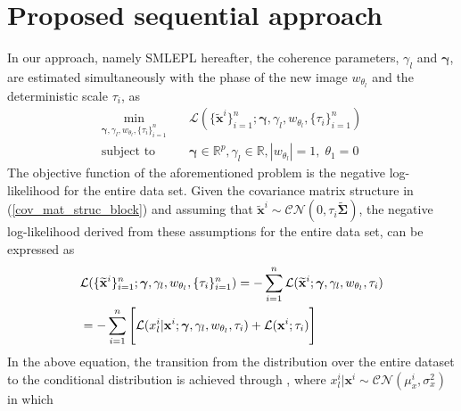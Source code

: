 \section{Proposed sequential approach}
    \label{section:approach}
    
    \vspace{-0.2cm}
    In our approach, namely \acs{SMLEPL} hereafter, the coherence parameters, $\gamma_l$ and $\boldsymbol{\gamma}$, are estimated simultaneously with the phase of the new image $w_{\theta_{l}}$ and the deterministic scale $\tau_i$, as %
    \vspace{-0.5em}
    \begin{equation}
        \begin{aligned}
            \min_{\boldsymbol{\gamma}, \gamma_{l}, w_{\theta_{l}}, \{\tau_i\}_{i=1}^n} \quad & \mathcal{L}(\{\mathbf{\widetilde{x}}^i\}_{i=1}^n; \boldsymbol{\gamma}, \gamma_{l}, w_{\theta_{l}}, \{\tau_i\}_{i=1}^n) \\ 
            \text{subject to} \quad & \boldsymbol{\gamma} \in \mathbb{R}^p, \gamma_{l} \in \mathbb{R}, |w_{\theta_{l}}| = 1, \; \theta_1 = 0
        \end{aligned}
        \label{eq:optim_prob_seq}
    \end{equation}
    The objective function of the aforementioned problem is the negative log-likelihood for the entire data set. Given the covariance matrix structure in (\ref{cov_mat_struc_block}) and assuming that $\mathbf{\widetilde{x}}^i \sim\mathcal{CN}(0, \tau_i \mathbf{\widetilde{\Sigma}})$, the negative log-likelihood derived from these assumptions for the entire data set, can be expressed as
    \vspace{-0.2cm}
    \begin{align}
        &\mathcal{L}(\{\mathbf{\widetilde{x}}^i\}_{i=1}^n; \boldsymbol{\gamma}, \gamma_{l}, w_{\theta_{l}}, \{\tau_i\}_{i=1}^n)  
        = - \sum_{i=1}^n \mathcal{L}(\mathbf{\widetilde{x}}^i; \boldsymbol{\gamma}, \gamma_{l}, w_{\theta_{l}}, \tau_i) \notag \\
        &= - \sum_{i=1}^n \Bigg[ \mathcal{L}(x_{l}^i | \mathbf{x}^i; \boldsymbol{\gamma}, \gamma_{l}, w_{\theta_{l}}, \tau_i) + \mathcal{L}(\mathbf{x}^i; \tau_i) \Bigg] \label{log_likelihood_eq} 
    \end{align}
    \noindent
    In the above equation, the transition from the distribution over the entire dataset to the conditional distribution is achieved through \citep{anderson1962introduction}, where $x_{l}^i|\mathbf{x}^i \sim \mathcal{CN}(\mu_x^i, \sigma^2_x)$ in which 
